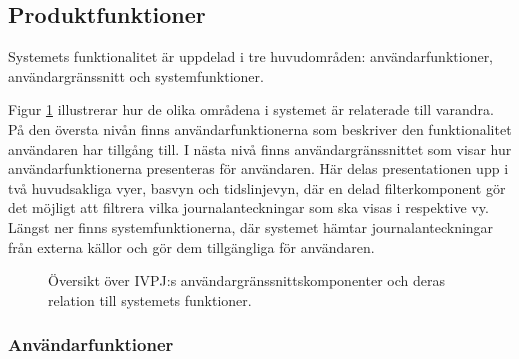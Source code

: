 \documentclass{article}
\begin{document}
\newpage
\subsection{Produktfunktioner}

Systemets funktionalitet är uppdelad i tre huvudområden: användarfunktioner, användargränssnitt och systemfunktioner.

Figur \ref{fig:komp} illustrerar hur de olika områdena i systemet är relaterade till varandra. På den översta nivån finns användarfunktionerna som beskriver den funktionalitet användaren har tillgång till. I nästa nivå finns användargränssnittet som visar hur användarfunktionerna presenteras för användaren. Här delas presentationen upp i två huvudsakliga vyer, basvyn och tidslinjevyn, där en delad filterkomponent gör det möjligt att filtrera vilka journalanteckningar som ska visas i respektive vy. Längst ner finns systemfunktionerna, där systemet hämtar journalanteckningar från externa källor och gör dem tillgängliga för användaren.

\begin{figure}[h]
    \centering
    
    \caption{Översikt över IVPJ:s användargränssnittskomponenter och deras relation till systemets funktioner.}
    \label{fig:komp}
\end{figure}

\subsubsection{Användarfunktioner}
\end{document}
